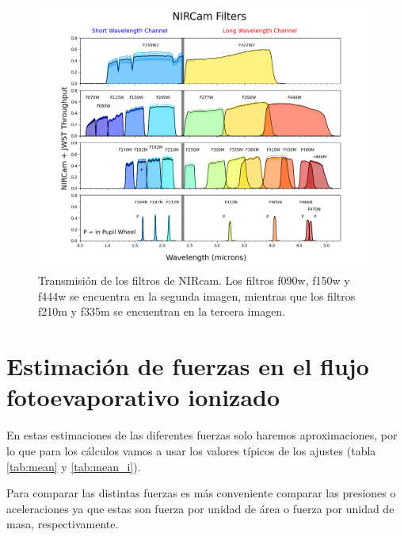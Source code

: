 \documentclass{book}
\begin{document}
\begin{figure}
    \centering
    \includegraphics[width=\textwidth]{Appendices/multi_filter_plot_per_detector_May2024.png}
    \caption{Transmisión de los filtros de NIRcam. Los filtros f090w, f150w y f444w se encuentra en la segunda imagen, mientras que los filtros f210m y f335m se encuentran en la tercera imagen.}
    \label{fig:filtros JWST}
\end{figure}

\chapter{Estimación de fuerzas en el flujo fotoevaporativo ionizado} \label{App:fuerzas}

En estas estimaciones de las diferentes fuerzas solo haremos aproximaciones, por lo que para los cálculos vamos a usar los valores típicos de los ajustes (tabla \ref{tab:mean} y \ref{tab:mean_i}).

Para comparar las distintas fuerzas es más conveniente comparar las presiones o aceleraciones ya que estas son fuerza por unidad de área o fuerza por unidad de masa, respectivamente. 
\end{document}
